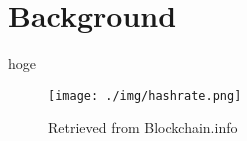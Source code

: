\chapter{Background}
\label{background}

hoge

\begin{figure}[h]
    \begin{center}
        \texttt{[image: ./img/hashrate.png]}
        \caption{Retrieved from Blockchain.info\cite{bitcoinhashrate}}
        \label{img:hashrate}
    \end{center}
\end{figure}
\fi
